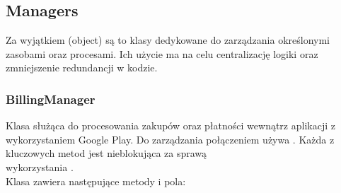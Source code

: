\newpage

\subsection{Managers}
Za wyjątkiem  (object) są to klasy dedykowane do zarządzania określonymi zasobami oraz procesami. Ich użycie ma na celu centralizację logiki oraz zmniejszenie redundancji w kodzie.

\subsubsection{BillingManager}
Klasa służąca do procesowania zakupów oraz płatności wewnątrz aplikacji z wykorzystaniem Google Play. Do zarządzania połączeniem używa . Każda z kluczowych metod jest nieblokująca za sprawą\\
wykorzystania .\\

Klasa  zawiera następujące metody i pola:

